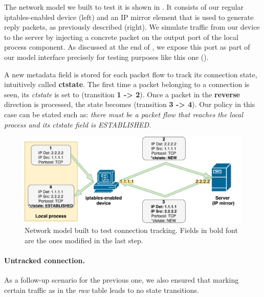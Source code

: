 The network model we built to test it is shown in
.  It consists of our regular
iptables-enabled device (left) and an IP mirror element that is used to
generate reply packets, as previously described (right).  We simulate traffic
from our device to the server by injecting a concrete packet on the output port
of the local process component.  As discussed at the end of
, we expose this port as part of our
model interface precisely for testing purposes like this one
().

A new metadata field is stored for each packet flow to track its connection
state, intuitively called \textbf{ctstate}.  The first time a packet belonging
to a connection is seen, its \emph{ctstate} is set to \NEW (transition
\textbf{1 -> 2}).  Once a packet in the \textbf{reverse} direction is
processed, the state becomes \ESTABLISHED (transition \textbf{3 -> 4}).  Our
policy in this case can be stated such as: \emph{there must be a packet flow
that reaches the local process and its ctstate field is ESTABLISHED}.

\begin{figure}[h]
  \centering
  \captionsetup{justification=centering}
  \includegraphics[scale=0.5]{assets/img/state-switch}
  \caption[Network model built to test connection tracking.]{Network model
  built to test connection tracking. Fields in bold font are the ones modified
  in the last step.}
  \label{fig:state-switch}
\end{figure}

\paragraph{Untracked connection.}
As a follow-up scenario for the previous one, we also ensured that marking
certain traffic as \UNTRACKED in the \emph{raw} table leads to no state
transitions.

\bigskip

